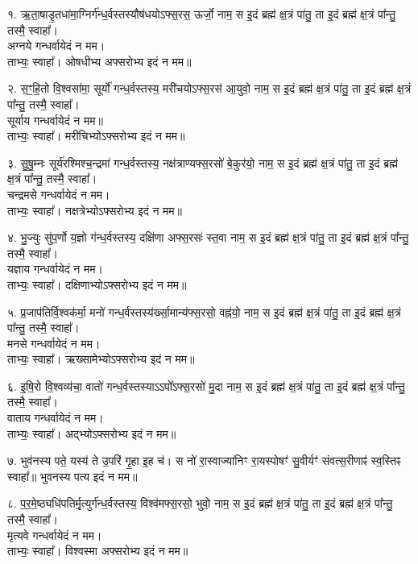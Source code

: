 १. ऋ॒ता॒षाडृ॒तधा॑मा॒ग्निर्ग॑न्ध॒र्वस्तस्यौष॑धयोऽफ्स॒रस॒ ऊर्जो॒ नाम॒
स इ॒दं ब्रह्म॑ क्ष॒त्रं पा॑तु॒ ता इ॒दं ब्रह्म॑ क्ष॒त्रं पा᳚न्तु॒ तस्मै॒ स्वाहा᳚। \\
अग्नये गन्धर्वायेदं न मम।\\
ताभ्यः॒ स्वाहा᳚। ओषधीभ्य अफ्सरोभ्य इदं न मम॥

२. स॒ꣳ॒हि॒तो वि॒श्वसा॑मा॒ सूर्यो॑ गन्ध॒र्वस्तस्य॒ मरी॑चयोऽफ्स॒रस॑ आ॒युवो॒ नाम॒ स इ॒दं ब्रह्म॑ क्ष॒त्रं पा॑तु॒ ता इ॒दं ब्रह्म॑ क्ष॒त्रं पा᳚न्तु॒ तस्मै॒ स्वाहा᳚।\\
सूर्याय गन्धर्वायेदं न मम॥\\
ताभ्यः॒ स्वाहा᳚। मरीचिभ्योऽफ्सरोभ्य इदं न मम॥

३. सु॒षु॒म्नः सूर्य॑रश्मिश्च॒न्द्रमा॑ गन्ध॒र्वस्तस्य॒ नक्ष॑त्राण्यफ्स॒रसो॑ बे॒कुर॑यो॒ नाम॒ स इ॒दं ब्रह्म॑ क्ष॒त्रं पा॑तु॒ ता इ॒दं ब्रह्म॑ क्ष॒त्रं पा᳚न्तु॒ तस्मै॒ स्वाहा᳚।\\
चन्द्रमसे गन्धर्वायेदं न मम।\\
ताभ्यः॒ स्वाहा᳚। नक्षत्रेभ्योऽफ्सरोभ्य इदं न मम॥

४. भु॒ज्युः सु॑प॒र्णो य॒ज्ञो ग॑न्ध॒र्वस्तस्य॒ दक्षि॑णा अफ्स॒रसः॑ स्त॒वा नाम॒ स इ॒दं ब्रह्म॑ क्ष॒त्रं पा॑तु॒ ता इ॒दं ब्रह्म॑ क्ष॒त्रं पा᳚न्तु॒ तस्मै॒ स्वाहा᳚।\\
यज्ञाय गन्धर्वायेदं न मम।\\
ताभ्यः॒ स्वाहा᳚। दक्षिणाभ्योऽफ्सरोभ्य इदं न मम॥

५. प्र॒जाप॑तिर्वि॒श्वक॑र्मा॒ मनो॑ गन्ध॒र्वस्तस्य॑र्ख्सा॒मान्य॑फ्स॒रसो॒ वह्न॑यो॒ नाम॒ स इ॒दं ब्रह्म॑ क्ष॒त्रं पा॑तु॒ ता इ॒दं ब्रह्म॑ क्ष॒त्रं पा᳚न्तु॒ तस्मै॒ स्वाहा᳚।\\
मनसे गन्धर्वायेदं न मम।\\
ताभ्यः॒ स्वाहा᳚। ऋख्सामेभ्योऽफ्सरोभ्य इदं न मम॥

६. इ॒षि॒रो वि॒श्वव्य॑चा॒ वातो॑ गन्ध॒र्वस्तस्याऽऽपो᳚ऽफ्स॒रसो॑ मु॒दा नाम॒ स इ॒दं ब्रह्म॑ क्ष॒त्रं पा॑तु॒ ता इ॒दं ब्रह्म॑ क्ष॒त्रं पा᳚न्तु॒ तस्मै॒ स्वाहा᳚।\\
वाताय गन्धर्वायेदं न मम।\\
ताभ्यः॒ स्वाहा᳚। अद्भ्योऽफ्सरोभ्य इदं न मम॥

७. भुव॑नस्य पते॒ यस्य॑ ते उ॒परि॑ गृ॒हा इ॒ह च॑।
स नो॑ रा॒स्वाज्या॑निꣳ रा॒यस्पोषꣳ॑ सु॒वीर्यꣳ॑ संवत्स॒रीणाꣴ॑ स्व॒स्तिꣴ स्वाहा᳚॥ भुवनस्य पत्य इदं न मम॥

८. प॒र॒मे॒ष्ठ्यधि॑पतिर्मृ॒त्युर्ग॑न्ध॒र्वस्तस्य॒ विश्व॑मफ्स॒रसो॒ भुवो॒ नाम॒ स इ॒दं ब्रह्म॑ क्ष॒त्रं पा॑तु॒ ता इ॒दं ब्रह्म॑ क्ष॒त्रं पा᳚न्तु॒ तस्मै॒ स्वाहा᳚।\\
मृत्यवे गन्धर्वायेदं न मम।\\
ताभ्यः॒ स्वाहा᳚। विश्वस्मा अफ्सरोभ्य इदं न मम॥

